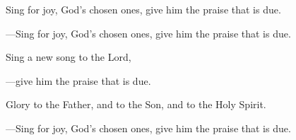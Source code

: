 \responsory
\begin{hangpar}

Sing for joy, God’s chosen ones, give him the praise that is due.

{\color{red}---\thinspace}Sing for joy, God’s chosen ones, give him the praise that is due.

\medskip Sing a new song to the Lord,

{\color{red}---\thinspace}give him the praise that is due.

\medskip Glory to the Father, and to the Son, and to the Holy Spirit.

{\color{red}---\thinspace}Sing for joy, God’s chosen ones, give him the praise that is due.
\end{hangpar}
